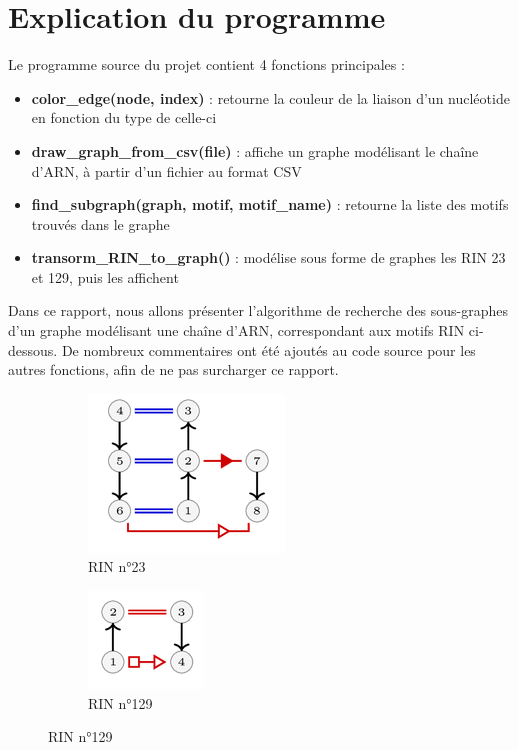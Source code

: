 \documentclass[11pt,a4paper]{article}
\begin{document}
\section{Explication du programme}
Le programme source du projet contient 4 fonctions principales : \\
\begin{itemize}

\item \textbf{color\_edge(node, index)} : retourne la couleur de la liaison d'un nucléotide en fonction du type de celle-ci \\
\item \textbf{draw\_graph\_from\_csv(file)} : affiche un graphe modélisant le chaîne d'ARN, à partir d'un fichier au format CSV \\
\item \textbf{find\_subgraph(graph, motif, motif\_name)} : retourne la liste des motifs trouvés dans le graphe\\
\item \textbf{transorm\_RIN\_to\_graph()} : modélise sous forme de graphes les RIN 23 et 129, puis les affichent
\end{itemize} 
\hfill\break
\hfill\break
Dans ce rapport, nous allons présenter l'algorithme de recherche des sous-graphes d'un graphe modélisant une chaîne d'ARN, correspondant aux motifs RIN ci-dessous. De nombreux commentaires ont été ajoutés au code source pour les autres fonctions, afin de ne pas surcharger ce rapport.


\begin{figure}[ht]
\begin{subfigure}{.5\textwidth}
  \centering
  \includegraphics[scale=1]{rin23_2.png}  
  \caption{RIN n°23}
  \label{fig:sub-first}
\end{subfigure}
\begin{subfigure}{.5\textwidth}
  \centering
  \includegraphics[scale=1]{rin129_2.png}  
  \caption{RIN n°129}
  \label{fig:sub-second}
\end{subfigure}
\end{figure}
\end{document}
